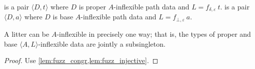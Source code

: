 \begin{definition}
     is a pair \( \langle D, t \rangle \) where \( D \) is proper \( A \)-inflexible path data and \( L = f_{\delta,\varepsilon}\ t \).
     is a pair \( \langle D, a \rangle \) where \( D \) is base \( A \)-inflexible path data and \( L = f_{\bot,\varepsilon}\ a \).
\end{definition}
\begin{lemma}
    A litter can be \( A \)-inflexible in precisely one way; that is, the types of proper and base \( \langle A, L \rangle \)-inflexible data are jointly a subsingleton.
\end{lemma}
\begin{proof}
    Use \cref{lem:fuzz_congr,lem:fuzz_injective}.
\end{proof}
